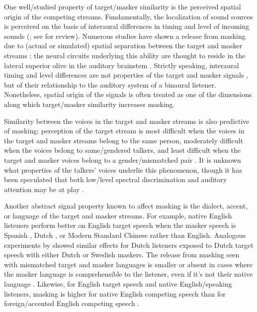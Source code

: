 One well\-/studied property of target\-/masker similarity is the perceived spatial origin of the competing streams.  Fundamentally, the localization of sound sources is perceived on the basis of interaural differences in timing and level of incoming sounds (\citealp[\eg,][]{Hirsh1950, Kock1950}; see \citealp{Darwin2008} for review).  Numerous studies have shown a release from masking due to (actual or simulated) spatial separation between the target and masker streams \citep[\eg,][]{CarhartEtAl1968, FreymanEtAl1999, BrungartSimpson2002, FreymanEtAl2004, GallunEtAl2005, KiddEtAl2005a, JohnstoneLitovsky2006}; the neural circuits underlying this ability are thought to reside in the lateral superior olive in the auditory brainstem \citep{ParkEtAl2004, TollinYin2005}.  Strictly speaking, interaural timing and level differences are not properties of the target and masker signals \perse, but of their relationship to the auditory system of a binaural listener.  Nonetheless, spatial origin of the signals is often treated as one of the dimensions along which target\-/masker similarity increases masking.   %

Similarity between the voices in the target and masker streams is also predictive of masking: perception of the target stream is most difficult when the voices in the target and masker streams belong to the same person, moderately difficult when the voices belong to same\-/gendered talkers, and least difficult when the target and masker voices belong to a gender\-/mismatched pair \citep{Brungart2001}.  It is unknown what properties of the talkers’ voices underlie this phenomenon, though it has been speculated that both low\-/level spectral discrimination and auditory attention may be at play \citep{HelferFreyman2008}.

Another abstract signal property known to affect masking is the dialect, accent, or language of the target and masker streams.  For example, native English listeners perform better on English target speech when the masker speech is Spanish \citep{GarciaLecumberriCooke2006}, Dutch \citep{BrouwerEtAl2012}, or Modern Standard Chinese \citep{VanEngenBradlow2007} rather than English.  Analogous experiments by \citet{RhebergenEtAl2005} showed similar effects for Dutch listeners exposed to Dutch target speech with either Dutch or Swedish maskers.  The release from masking seen with mismatched target and masker languages is smaller or absent in cases where the masker language is comprehensible to the listener, even if it’s not their native language \citep{GarciaLecumberriCooke2006, VanEngen2010, BrouwerEtAl2012}.  Likewise, for English target speech and native English\-/speaking listeners, masking is higher for native English competing speech than for foreign\-/accented English competing speech \citep{CalandruccioEtAl2010}.\footnotemark{}


